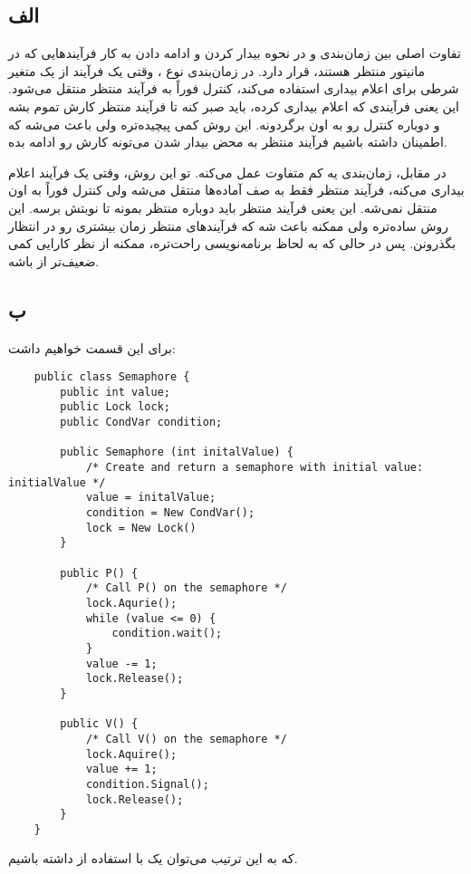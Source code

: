 \subsection*{الف}
تفاوت اصلی بین زمان‌بندی 
و
در نحوه بیدار کردن و ادامه دادن به کار فرآیندهایی که در مانیتور منتظر هستند، قرار دارد. در زمان‌بندی نوع
، وقتی یک فرآیند از یک متغیر شرطی برای اعلام بیداری استفاده می‌کند، کنترل فوراً به فرآیند منتظر منتقل می‌شود. این یعنی فرآیندی که اعلام بیداری کرده، باید صبر کنه تا فرآیند منتظر کارش تموم بشه و دوباره کنترل رو به اون برگردونه. این روش کمی پیچیده‌تره ولی باعث می‌شه که اطمینان داشته باشیم فرآیند منتظر به محض بیدار شدن می‌تونه کارش رو ادامه بده.

در مقابل، زمان‌بندی
یه کم متفاوت عمل می‌کنه. تو این روش، وقتی یک فرآیند اعلام بیداری می‌کنه، فرآیند منتظر فقط به صف آماده‌ها منتقل می‌شه ولی کنترل فوراً به اون منتقل نمی‌شه. این یعنی فرآیند منتظر باید دوباره منتظر بمونه تا نوبتش برسه. این روش ساده‌تره ولی ممکنه باعث شه که فرآیندهای منتظر زمان بیشتری رو در انتظار بگذرونن. پس در حالی که
به لحاظ برنامه‌نویسی راحت‌تره، ممکنه از نظر کارایی کمی ضعیف‌تر از
باشه.

\subsection*{ب}
برای این قسمت خواهیم داشت:
\LTR
\begin{verbatim}
    public class Semaphore {
        public int value;
        public Lock lock;
        public CondVar condition;

        public Semaphore (int initalValue) {
            /* Create and return a semaphore with initial value: initialValue */
            value = initalValue;
            condition = New CondVar();
            lock = New Lock()
        }

        public P() {
            /* Call P() on the semaphore */
            lock.Aqurie();
            while (value <= 0) {
                condition.wait();
            }
            value -= 1;
            lock.Release();
        }

        public V() {
            /* Call V() on the semaphore */
            lock.Aquire();
            value += 1;
            condition.Signal();
            lock.Release();
        }
    }
\end{verbatim}
\RTL
که به این ترتیب می‌توان یک
با استفاده از
داشته باشیم.

